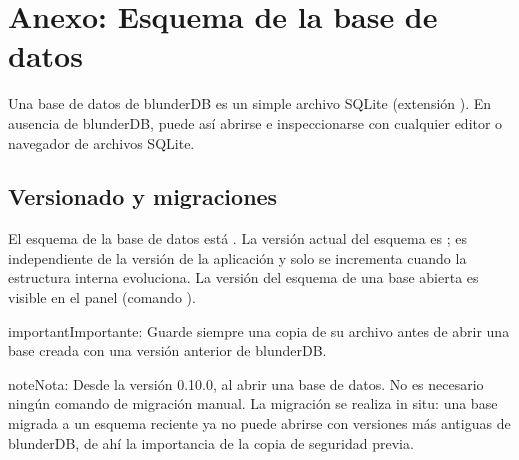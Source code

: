 \documentclass[letterpaper,10pt,spanish]{sphinxmanual}
\begin{document}
\sphinxstepscope


\section{Anexo: Esquema de la base de datos}
\label{\detokenize{annexe_db_scheme:annexe-schema-de-la-base-de-donnees}}\label{\detokenize{annexe_db_scheme:annexe-db-migration}}\label{\detokenize{annexe_db_scheme::doc}}
\sphinxAtStartPar
Una base de datos de blunderDB es un simple archivo SQLite (extensión ). En ausencia de blunderDB, puede así abrirse e inspeccionarse con cualquier editor o navegador de archivos SQLite.


\subsection{Versionado y migraciones}
\label{\detokenize{annexe_db_scheme:versionnage-et-migrations}}
\sphinxAtStartPar
El esquema de la base de datos está . La versión actual del esquema es ; es independiente de la versión de la aplicación y solo se incrementa cuando la estructura interna evoluciona. La versión del esquema de una base abierta es visible en el panel  (comando ).

\begin{sphinxadmonition}{important}{Importante:}
\sphinxAtStartPar
Guarde siempre una copia de su archivo  antes de abrir una base creada con una versión anterior de blunderDB.
\end{sphinxadmonition}

\begin{sphinxadmonition}{note}{Nota:}
\sphinxAtStartPar
Desde la versión 0.10.0,  al abrir una base de datos. No es necesario ningún comando de migración manual. La migración se realiza in situ: una base migrada a un esquema reciente ya no puede abrirse con versiones más antiguas de blunderDB, de ahí la importancia de la copia de seguridad previa.
\end{sphinxadmonition}
\end{document}
